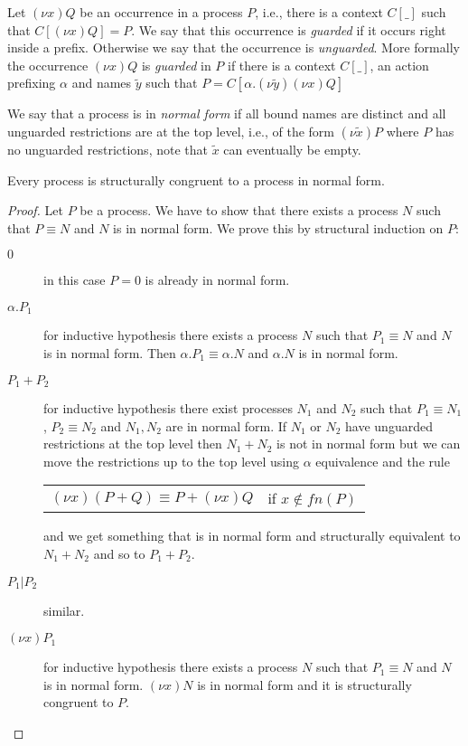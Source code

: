 \begin{definition}
  Let $(\nu x)Q$ be an occurrence in a process $P$, i.e., there is a context $C[\_]$ such that $C[(\nu x)Q]=P$. We say that this occurrence is \emph{guarded} if it occurs right inside a prefix. Otherwise we say that the occurrence is \emph{unguarded}. More formally the occurrence $(\nu x)Q$ is \emph{guarded} in $P$ if there is a context $C[\_]$, an action prefixing $\alpha$ and names $\tilde{y}$ such that $P=C[\alpha.(\nu \tilde{y})(\nu x)Q]$
\end{definition}

\begin{definition}
  We say that a process is in \emph{normal form} if all bound names are distinct and all unguarded restrictions are at the top level, i.e., of the form $(\nu \tilde{x})P$ where $P$ has no unguarded restrictions, note that $\tilde{x}$ can eventually be empty.
\end{definition}

\begin{lemma}\label{existenceOfNormalForm}
  Every process is structurally congruent to a process in normal form.
  \begin{proof}
    Let $P$ be a process. We have to show that there exists a process $N$ such that $P \equiv N$ and $N$ is in normal form. We prove this by structural induction on $P$:
    \begin{description}
      \item[$0$] 
	in this case $P=0$ is already in normal form.
      \item[$\alpha.P_{1}$] 
	for inductive hypothesis there exists a process $N$ such that $P_{1} \equiv N$ and $N$ is in normal form. Then $\alpha.P_{1} \equiv \alpha.N$ and $\alpha.N$ is in normal form.
      \item[$P_{1}+P_{2}$]
	for inductive hypothesis there exist processes $N_{1}$ and $N_{2}$ such that $P_{1} \equiv N_{1}$, $P_{2} \equiv N_{2}$ and $N_{1}, N_{2}$ are in normal form. If $N_{1}$ or $N_{2}$ have unguarded restrictions at the top level then $N_{1}+N_{2}$ is not in normal form but we can move the restrictions up to the top level using $\alpha$ equivalence and the rule 
	\begin{center}
	  \begin{tabular}{ll}
	      $(\nu x)(P+Q) \equiv P + (\nu x)Q$ 
	    &
	      if $x\notin fn(P)$
	  \end{tabular}
	\end{center}
	and we get something that is in normal form and structurally equivalent to $N_{1}+N_{2}$ and so to $P_{1}+P_{2}$.
      \item[$P_{1}|P_{2}$] similar.
      \item[$(\nu x)P_{1}$] 
	for inductive hypothesis there exists a process $N$ such that $P_{1} \equiv N$ and $N$ is in normal form. $(\nu x)N$ is in normal form and it is structurally congruent to $P$.
    \end{description}
  \end{proof}
\end{lemma}


